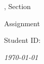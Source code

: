 \ifx\CROWDMARK\undefined

\ifx\assignmenttitle\undefined
\newcommand{\assignmenttitle}{Assignment \assignmentnum}
\fi
\begin{titlepage}
\centering

\vspace*{2.5cm}
        
{\Large \coursename
\ifdefined\coursesec
, Section \coursesec
\fi
\vspace{0.5cm}

\assignmenttitle}

\vspace{3.5cm}
        
\studentname

\vspace{.5cm}

Student ID: \studentid
\vspace{3.5cm}

\textit{\today}

\end{titlepage}
   
\fi